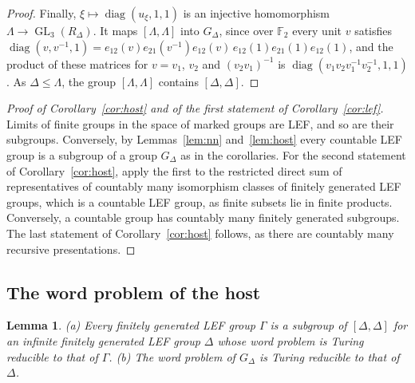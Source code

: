 \documentclass[11pt]{amsart}
\newtheorem{lemma}{Lemma}
\newcommand{\F}{\mathbb F}
\newcommand{\GL}{\operatorname{GL}}
\begin{document}
\begin{proof}
Finally, $\xi\mapsto\operatorname{diag}(u_\xi,1,1)$ is an injective
homomorphism $\Lambda\to\GL_3(R_\Delta)$. It maps $[\Lambda,\Lambda]$ into
$G_\Delta$, since over $\F_2$ every unit $v$ satisfies
$\operatorname{diag}(v,v^{-1},1)=e_{12}(v)e_{21}(v^{-1})e_{12}(v)\,e_{12}(1)e_{21}(1)e_{12}(1)$,
and the product of these matrices for $v=v_1$, $v_2$ and $(v_2v_1)^{-1}$ is
$\operatorname{diag}(v_1v_2v_1^{-1}v_2^{-1},1,1)$. As $\Delta\le\Lambda$,
the group $[\Lambda,\Lambda]$ contains $[\Delta,\Delta]$.
\end{proof}

\begin{proof}[Proof of Corollary~\ref{cor:host} and of the first statement
of Corollary~\ref{cor:lef}]
Limits of finite groups in the space of marked groups are LEF, and so are
their subgroups. Conversely, by Lemmas~\ref{lem:nn} and~\ref{lem:host}
every countable LEF group is a subgroup of a group $G_\Delta$ as in the
corollaries. For the second statement of Corollary~\ref{cor:host}, apply
the first to the restricted direct sum of representatives of countably many
isomorphism classes of finitely generated LEF groups, which is a countable
LEF group, as finite subsets lie in finite products. Conversely, a countable
group has countably many finitely generated subgroups. The last statement
of Corollary~\ref{cor:host} follows, as there are countably many recursive
presentations.
\end{proof}

\subsection*{The word problem of the host}

\begin{lemma}\label{lem:halfline}
\textup{(a)} Every finitely generated LEF group $\Gamma$ is a subgroup of
$[\Delta,\Delta]$ for an infinite finitely generated LEF group $\Delta$
whose word problem is Turing reducible to that of $\Gamma$.
\textup{(b)} The word problem of $G_\Delta$ is Turing reducible to that of
$\Delta$.
\end{lemma}
\end{document}
